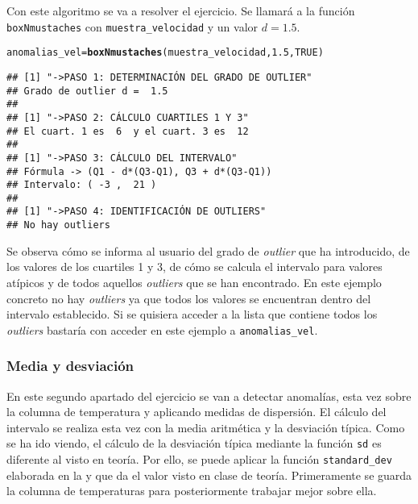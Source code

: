 \documentclass[12pt]{report}\usepackage[]{graphicx}\usepackage[dvipsnames]{xcolor}
\makeatletter
\newcommand{\hlnum}[1]{\textcolor[rgb]{0.686,0.059,0.569}{#1}}%
\newcommand{\hlstd}[1]{\textcolor[rgb]{0.345,0.345,0.345}{#1}}%
\newcommand{\hlkwb}[1]{\textcolor[rgb]{0.69,0.353,0.396}{#1}}%
\newcommand{\hlkwd}[1]{\textcolor[rgb]{0.737,0.353,0.396}{\textbf{#1}}}%
\newenvironment{kframe}{%
 \def\at@end@of@kframe{}%
 \ifinner\ifhmode%
  \def\at@end@of@kframe{\end{minipage}}%
  \begin{minipage}{\columnwidth}%
 \fi\fi%
 \def\FrameCommand##1{\hskip\@totalleftmargin \hskip-\fboxsep
 \colorbox{shadecolor}{##1}\hskip-\fboxsep
     \hskip-\linewidth \hskip-\@totalleftmargin \hskip\columnwidth}%
 \MakeFramed {\advance\hsize-\width
   \@totalleftmargin\z@ \linewidth\hsize
   \@setminipage}}%
 {\par\unskip\endMakeFramed%
 \at@end@of@kframe}
\newenvironment{knitrout}{}{} %
\makeatother
\begin{document}
					Con este algoritmo se va a resolver el ejercicio. Se llamará a la función \texttt{boxNmustaches} con \texttt{muestra\_velocidad} y un valor $d = 1.5$.
					
\begin{knitrout}
\color{fgcolor}\begin{kframe}
\begin{alltt}
\hlstd{anomalias_vel} \hlkwb{=} \hlkwd{boxNmustaches}\hlstd{(muestra_velocidad,} \hlnum{1.5}\hlstd{,} \hlnum{TRUE}\hlstd{)}
\end{alltt}
\begin{verbatim}
## [1] "->PASO 1: DETERMINACIÓN DEL GRADO DE OUTLIER"
## Grado de outlier d =  1.5 
## 
## [1] "->PASO 2: CÁLCULO CUARTILES 1 Y 3"
## El cuart. 1 es  6  y el cuart. 3 es  12 
## 
## [1] "->PASO 3: CÁLCULO DEL INTERVALO"
## Fórmula -> (Q1 - d*(Q3-Q1), Q3 + d*(Q3-Q1))
## Intervalo: ( -3 ,  21 )
## 
## [1] "->PASO 4: IDENTIFICACIÓN DE OUTLIERS"
## No hay outliers
\end{verbatim}
\end{kframe}
\end{knitrout}
					
					Se observa cómo se informa al usuario del grado de \textit{outlier} que ha introducido, de los valores de los cuartiles 1 y 3, de cómo se calcula el intervalo para valores atípicos y de todos aquellos \textit{outliers} que se han encontrado. En este ejemplo concreto no hay \textit{outliers} ya que todos los valores se encuentran dentro del intervalo establecido. Si se quisiera acceder a la lista que contiene todos los \textit{outliers} bastaría con acceder en este ejemplo a \texttt{anomalias\_vel}.
					
				\subsubsection{Media y desviación}
					
					En este segundo apartado del ejercicio se van a detectar anomalías, esta vez sobre la columna de temperatura y aplicando medidas de dispersión. El cálculo del intervalo se realiza esta vez con la media aritmética y la desviación típica. Como se ha ido viendo, el cálculo de la desviación típica mediante la función \texttt{sd} es diferente al visto en teoría. Por ello, se puede aplicar la función \texttt{standard\_dev} elaborada en la  y que da el valor visto en clase de teoría. Primeramente se guarda la columna de temperaturas para posteriormente trabajar mejor sobre ella.
					
\end{document}
